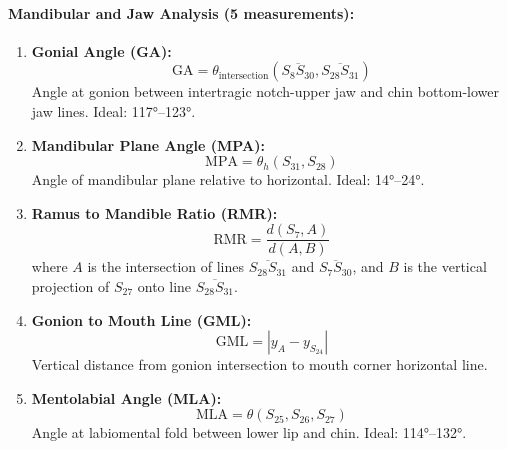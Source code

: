 \paragraph{Mandibular and Jaw Analysis (5 measurements):}
\begin{enumerate}[resume]
    \item \textbf{Gonial Angle (GA):}
    \begin{equation}
    \text{GA} = \theta_{\text{intersection}}(\overline{S_8S_{30}}, \overline{S_{28}S_{31}})
    \end{equation}
    Angle at gonion between intertragic notch-upper jaw and chin bottom-lower jaw lines. Ideal: 117°--123°.
    
    \item \textbf{Mandibular Plane Angle (MPA):}
    \begin{equation}
    \text{MPA} = \theta_h(S_{31}, S_{28})
    \end{equation}
    Angle of mandibular plane relative to horizontal. Ideal: 14°--24°.
    
    \item \textbf{Ramus to Mandible Ratio (RMR):}
    \begin{equation}
    \text{RMR} = \frac{d(S_7, A)}{d(A, B)}
    \end{equation}
    where $A$ is the intersection of lines $\overline{S_{28}S_{31}}$ and $\overline{S_7S_{30}}$, and $B$ is the vertical projection of $S_{27}$ onto line $\overline{S_{28}S_{31}}$.
    
    \item \textbf{Gonion to Mouth Line (GML):}
    \begin{equation}
    \text{GML} = |y_A - y_{S_{24}}|
    \end{equation}
    Vertical distance from gonion intersection to mouth corner horizontal line.
    
    \item \textbf{Mentolabial Angle (MLA):}
    \begin{equation}
    \text{MLA} = \theta(S_{25}, S_{26}, S_{27})
    \end{equation}
    Angle at labiomental fold between lower lip and chin. Ideal: 114°--132°.
\end{enumerate}


